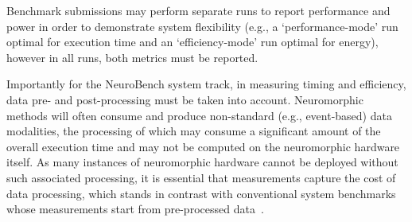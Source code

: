 
    Benchmark submissions may perform separate runs to report performance and power in order to demonstrate system flexibility (e.g., a `performance-mode' run optimal for execution time and an `efficiency-mode' run optimal for energy), however in all runs, both metrics must be reported.

    Importantly for the NeuroBench system track, in measuring timing and efficiency, data pre- and post-processing must be taken into account. Neuromorphic methods will often consume and produce non-standard (e.g., event-based) data modalities, the processing of which may consume a significant amount of the overall execution time and may not be computed on the neuromorphic hardware itself. As many instances of neuromorphic hardware cannot be deployed without such associated processing, it is essential that measurements capture the cost of data processing, which stands in contrast with conventional system benchmarks whose measurements start from pre-processed data~\cite{mlperf_policies}.



